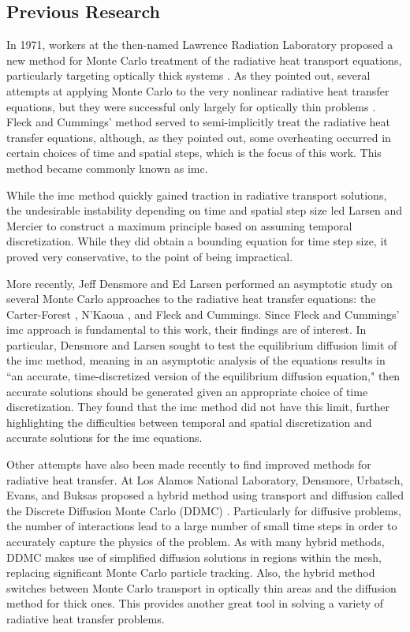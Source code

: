 \subsection{Previous Research}
In 1971, workers at the then-named Lawrence Radiation Laboratory proposed a new method for Monte Carlo treatment of the radiative heat transport equations, particularly targeting optically thick systems \cite{FleckCumm}.  As they pointed out, several attempts at applying Monte Carlo to the very nonlinear radiative heat transfer equations, but they were successful only largely for optically thin problems \cite{Fleck2}.  Fleck and Cummings' method served to semi-implicitly treat the radiative heat transfer equations, although, as they pointed out, some overheating occurred in certain choices of time and spatial steps, which is the focus of this work.  This method became commonly known as \gls{imc}.

While the \gls{imc} method quickly gained traction in radiative transport solutions, the undesirable instability depending on time and spatial step size led Larsen and Mercier to construct a maximum principle based on assuming temporal discretization.  While they did obtain a bounding equation for time step size, it proved very conservative, to the point of being impractical. 

More recently, Jeff Densmore and Ed Larsen \cite{DenLar} performed an asymptotic study on several Monte Carlo approaches to the radiative heat transfer equations: the Carter-Forest \cite{CarterForest}, N'Kaoua \cite{Nkaoua}, and Fleck and Cummings.  Since Fleck and Cummings' \gls{imc} approach is fundamental to this work, their findings are of interest.  In particular, Densmore and Larsen sought to test the equilibrium diffusion limit of the \gls{imc} method, meaning in an asymptotic analysis of the equations results in ``an accurate, time-discretized version of the equilibrium diffusion equation," then accurate solutions should be generated given an appropriate choice of time discretization.  They found that the \gls{imc} method did not have this limit, further highlighting the difficulties between temporal and spatial discretization and accurate solutions for the \gls{imc} equations.

Other attempts have also been made recently to find improved methods for radiative heat transfer.  At Los Alamos National Laboratory, Densmore, Urbatsch, Evans, and Buksas proposed a hybrid method using transport and diffusion called the Discrete Diffusion Monte Carlo (DDMC) \cite{ddmc}.  Particularly for diffusive problems, the number of interactions lead to a large number of small time steps in order to accurately capture the physics of the problem.  As with many hybrid methods, DDMC makes use of simplified diffusion solutions in regions within the mesh, replacing significant Monte Carlo particle tracking.  Also, the hybrid method switches between Monte Carlo transport in optically thin areas and the diffusion method for thick ones.  This provides another great tool in solving a variety of radiative heat transfer problems.

